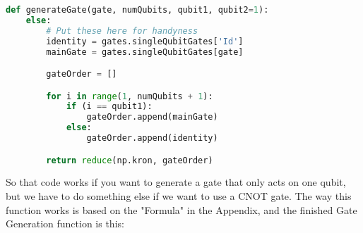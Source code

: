 \documentclass[../main.tex]{subfiles}
\begin{document}
\begin{lstlisting}[language=Python]
def generateGate(gate, numQubits, qubit1, qubit2=1):
    else:
        # Put these here for handyness
        identity = gates.singleQubitGates['Id']
        mainGate = gates.singleQubitGates[gate]

        gateOrder = []

        for i in range(1, numQubits + 1):
            if (i == qubit1):
                gateOrder.append(mainGate)
            else:
                gateOrder.append(identity)

        return reduce(np.kron, gateOrder)
\end{lstlisting}

So that code works if you want to generate a gate that only acts on one qubit, but we have to do something else if we want to use a CNOT gate. The way this function works is based on the "Formula" in the Appendix, and the finished Gate Generation function is this:


\end{document}
